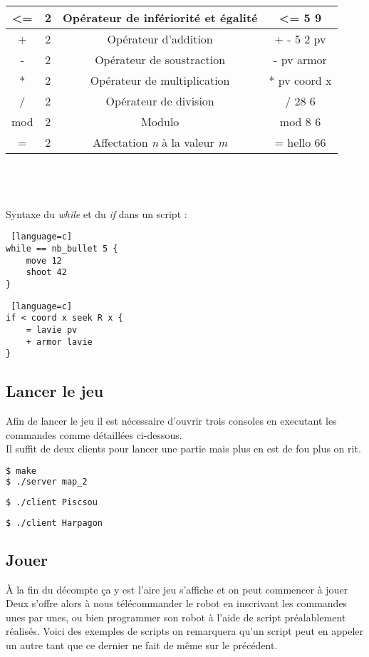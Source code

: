\documentclass[a4paper, 11pt]{article}
\begin{document}
\begin{tabular}{|c|c|c|c|}
   \hline
   <= & 2 & Opérateur de infériorité et égalité  & <= 5 9 \\
   \hline
	 + & 2 & Opérateur d'addition & + - 5 2 pv \\
	 \hline
   - & 2 & Opérateur de soustraction & - pv armor \\
   \hline
   * & 2 & Opérateur de multiplication & * pv coord x \\
   \hline
	 / & 2 & Opérateur de division & / 28 6 \\
	 \hline
   mod & 2 & Modulo & mod 8 6 \\
   \hline
   = & 2 & Affectation \emph{n} à la valeur \emph{m}  & = hello 66 \\
   \hline
\end{tabular}
\\\\\\
Syntaxe du \emph{while} et du \emph{if} dans un script :
\begin {lstlisting} [language=c]
while == nb_bullet 5 {
	move 12
	shoot 42
}
\end{lstlisting}

\begin {lstlisting} [language=c]
if < coord x seek R x {
	= lavie pv
	+ armor lavie
}
\end{lstlisting}

\subsection{Lancer le jeu}
Afin de lancer le jeu il est nécessaire d'ouvrir trois consoles en executant les commandes comme détaillées ci-dessous.\\
Il suffit de deux clients pour lancer une partie mais plus en est de fou plus on rit.
\begin {lstlisting}[language=bash,title={Console - Serveur}]
$ make
$ ./server map_2
\end{lstlisting}
\begin {lstlisting}[language=bash,title={Console - Client 2}]
$ ./client Piscsou
\end{lstlisting}
\begin {lstlisting}[language=bash,title={Console - Client 3}]
$ ./client Harpagon
\end{lstlisting}

\subsection{Jouer}
À la fin du décompte ça y est l'aire jeu s'affiche et on peut commencer à jouer\\
Deux s'offre alors à nous télécommander le robot en inscrivant les commandes unes par unes, ou bien programmer son robot à l'aide de script préalablement réalisés.
Voici des exemples de scripts on remarquera qu'un script peut en appeler un autre tant que ce dernier ne fait de même sur le précédent.\\
\end{document}
